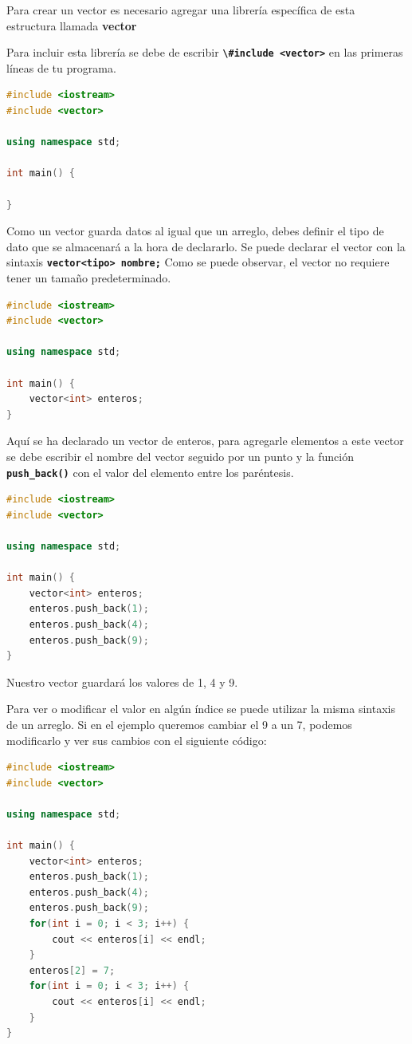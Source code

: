 \documentclass{article}
\begin{document}
Para crear un vector es necesario agregar una librería específica de esta estructura llamada \textbf{vector}

Para incluir esta librería se debe de escribir \textbf{\lstinline{\#include <vector>}} en las primeras líneas de tu programa.

\begin{lstlisting}[language=C++, title=Vectores]
#include <iostream>
#include <vector>

using namespace std;

int main() {

}
\end{lstlisting}

Como un vector guarda datos al igual que un arreglo, debes definir el tipo de dato que se almacenará a la hora de declararlo. Se puede declarar el vector con la sintaxis \textbf{\lstinline{vector<tipo> nombre;}} Como se puede observar, el vector no requiere tener un tamaño predeterminado.

\begin{lstlisting}[language=C++, title=Vectores]
#include <iostream>
#include <vector>

using namespace std;

int main() {
	vector<int> enteros;
}
\end{lstlisting}

Aquí se ha declarado un vector de enteros, para agregarle elementos a este vector se debe escribir el nombre del vector seguido por un punto y la función \textbf{\lstinline{push_back()}} con el valor del elemento entre los paréntesis.

\begin{lstlisting}[language=C++, title=Agregando valores]
#include <iostream>
#include <vector>

using namespace std;

int main() {
	vector<int> enteros;
	enteros.push_back(1);
	enteros.push_back(4);
	enteros.push_back(9);
}
\end{lstlisting}

Nuestro vector guardará los valores de 1, 4 y 9.

Para ver o modificar el valor en algún índice se puede utilizar la misma sintaxis de un arreglo. Si en el ejemplo queremos cambiar el 9 a un 7, podemos modificarlo y ver sus cambios con el siguiente código:

\begin{lstlisting}[language=C++, title=Modificando valores]
#include <iostream>
#include <vector>

using namespace std;

int main() {
	vector<int> enteros;
	enteros.push_back(1);
	enteros.push_back(4);
	enteros.push_back(9);
	for(int i = 0; i < 3; i++) {
		cout << enteros[i] << endl;
	}
	enteros[2] = 7;
	for(int i = 0; i < 3; i++) {
		cout << enteros[i] << endl;
	}
}
\end{lstlisting}
\end{document}
